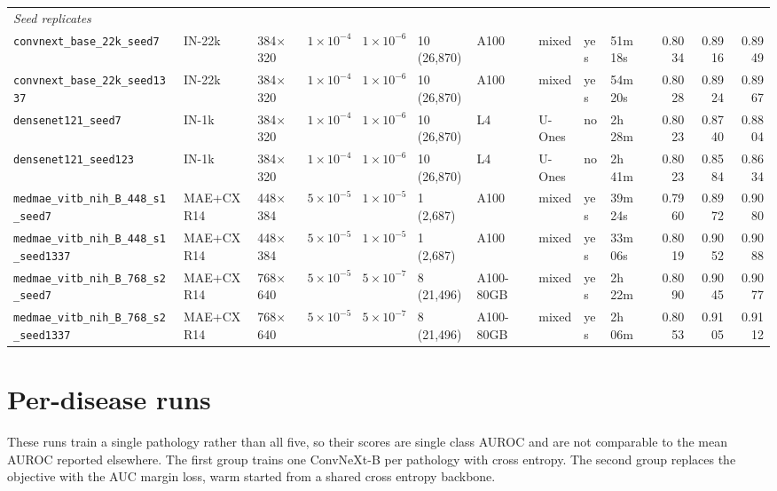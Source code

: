 \begin{landscape}
\begin{longtable}{llllllllllrrr}
    \midrule
    \multicolumn{13}{l}{\textit{Seed replicates}} \\
    \texttt{\scriptsize convnext\_base\_22k\_seed7} & IN-22k & 384$\times$320 & $1\times10^{-4}$ & $1\times10^{-6}$ & 10 (26,870) & A100 & mixed & yes & 51m\,18s & 0.8034 & 0.8916 & 0.8949 \\
    \texttt{\scriptsize convnext\_base\_22k\_seed1337} & IN-22k & 384$\times$320 & $1\times10^{-4}$ & $1\times10^{-6}$ & 10 (26,870) & A100 & mixed & yes & 54m\,20s & 0.8028 & 0.8924 & 0.8967 \\
    \texttt{\scriptsize densenet121\_seed7} & IN-1k & 384$\times$320 & $1\times10^{-4}$ & $1\times10^{-6}$ & 10 (26,870) & L4 & U-Ones & no & 2h\,28m & 0.8023 & 0.8740 & 0.8804 \\
    \texttt{\scriptsize densenet121\_seed123} & IN-1k & 384$\times$320 & $1\times10^{-4}$ & $1\times10^{-6}$ & 10 (26,870) & L4 & U-Ones & no & 2h\,41m & 0.8023 & 0.8584 & 0.8634 \\
    \texttt{\scriptsize medmae\_vitb\_nih\_B\_448\_s1\_seed7} & MAE+CXR14 & 448$\times$384 & $5\times10^{-5}$ & $1\times10^{-5}$ & 1 (2,687) & A100 & mixed & yes & 39m\,24s & 0.7960 & 0.8972 & 0.9080 \\
    \texttt{\scriptsize medmae\_vitb\_nih\_B\_448\_s1\_seed1337} & MAE+CXR14 & 448$\times$384 & $5\times10^{-5}$ & $1\times10^{-5}$ & 1 (2,687) & A100 & mixed & yes & 33m\,06s & 0.8019 & 0.9052 & 0.9088 \\
    \texttt{\scriptsize medmae\_vitb\_nih\_B\_768\_s2\_seed7} & MAE+CXR14 & 768$\times$640 & $5\times10^{-5}$ & $5\times10^{-7}$ & 8 (21,496) & A100-80GB & mixed & yes & 2h\,22m & 0.8090 & 0.9045 & 0.9077 \\
    \texttt{\scriptsize medmae\_vitb\_nih\_B\_768\_s2\_seed1337} & MAE+CXR14 & 768$\times$640 & $5\times10^{-5}$ & $5\times10^{-7}$ & 8 (21,496) & A100-80GB & mixed & yes & 2h\,06m & 0.8053 & 0.9105 & 0.9112 \\
  \end{longtable}
\end{landscape}

\section{Per-disease runs}
\label{app:perdisease}

These runs train a single pathology rather than all five, so their scores are
single class AUROC and are not comparable to the mean AUROC reported elsewhere.
The first group trains one ConvNeXt-B per pathology with cross entropy. The
second group replaces the objective with the AUC margin loss, warm started
from a shared cross entropy backbone.

